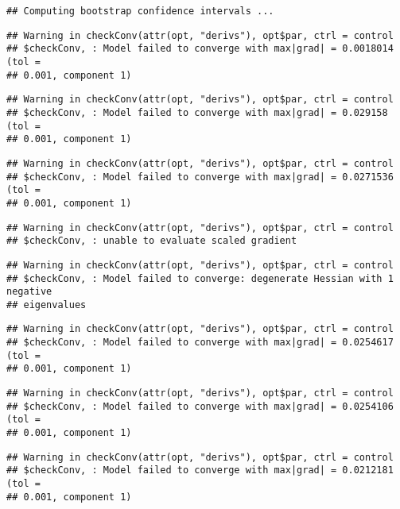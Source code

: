 \documentclass[]{article}
\begin{document}
\begin{verbatim}
## Computing bootstrap confidence intervals ...
\end{verbatim}

\begin{verbatim}
## Warning in checkConv(attr(opt, "derivs"), opt$par, ctrl = control
## $checkConv, : Model failed to converge with max|grad| = 0.0018014 (tol =
## 0.001, component 1)
\end{verbatim}

\begin{verbatim}
## Warning in checkConv(attr(opt, "derivs"), opt$par, ctrl = control
## $checkConv, : Model failed to converge with max|grad| = 0.029158 (tol =
## 0.001, component 1)
\end{verbatim}

\begin{verbatim}
## Warning in checkConv(attr(opt, "derivs"), opt$par, ctrl = control
## $checkConv, : Model failed to converge with max|grad| = 0.0271536 (tol =
## 0.001, component 1)
\end{verbatim}

\begin{verbatim}
## Warning in checkConv(attr(opt, "derivs"), opt$par, ctrl = control
## $checkConv, : unable to evaluate scaled gradient
\end{verbatim}

\begin{verbatim}
## Warning in checkConv(attr(opt, "derivs"), opt$par, ctrl = control
## $checkConv, : Model failed to converge: degenerate Hessian with 1 negative
## eigenvalues
\end{verbatim}

\begin{verbatim}
## Warning in checkConv(attr(opt, "derivs"), opt$par, ctrl = control
## $checkConv, : Model failed to converge with max|grad| = 0.0254617 (tol =
## 0.001, component 1)
\end{verbatim}

\begin{verbatim}
## Warning in checkConv(attr(opt, "derivs"), opt$par, ctrl = control
## $checkConv, : Model failed to converge with max|grad| = 0.0254106 (tol =
## 0.001, component 1)
\end{verbatim}

\begin{verbatim}
## Warning in checkConv(attr(opt, "derivs"), opt$par, ctrl = control
## $checkConv, : Model failed to converge with max|grad| = 0.0212181 (tol =
## 0.001, component 1)
\end{verbatim}
\end{document}
